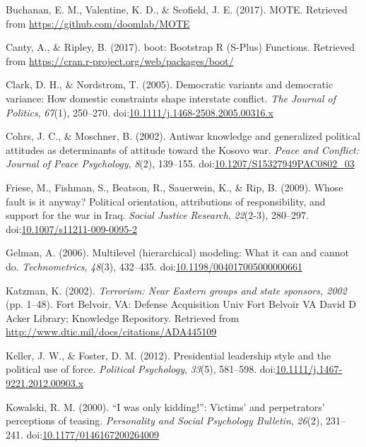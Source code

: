 \documentclass[english,,man]{apa6}
\theoremstyle{definition}
\theoremstyle{definition}
\theoremstyle{definition}
\theoremstyle{remark}
\begin{document}
\leavevmode\hypertarget{ref-Buchanan2017}{}%
Buchanan, E. M., Valentine, K. D., \& Scofield, J. E. (2017). MOTE.
Retrieved from \url{https://github.com/doomlab/MOTE}

\leavevmode\hypertarget{ref-Canty2017}{}%
Canty, A., \& Ripley, B. (2017). boot: Bootstrap R (S-Plus) Functions.
Retrieved from \url{https://cran.r-project.org/web/packages/boot/}

\leavevmode\hypertarget{ref-Clark2005}{}%
Clark, D. H., \& Nordstrom, T. (2005). Democratic variants and
democratic variance: How domestic constraints shape interstate conflict.
\emph{The Journal of Politics}, \emph{67}(1), 250--270.
doi:\href{https://doi.org/10.1111/j.1468-2508.2005.00316.x}{10.1111/j.1468-2508.2005.00316.x}

\leavevmode\hypertarget{ref-Cohrs2002}{}%
Cohrs, J. C., \& Moschner, B. (2002). Antiwar knowledge and generalized
political attitudes as determinants of attitude toward the Kosovo war.
\emph{Peace and Conflict: Journal of Peace Psychology}, \emph{8}(2),
139--155.
doi:\href{https://doi.org/10.1207/S15327949PAC0802_03}{10.1207/S15327949PAC0802\_03}

\leavevmode\hypertarget{ref-Friese2009}{}%
Friese, M., Fishman, S., Beatson, R., Sauerwein, K., \& Rip, B. (2009).
Whose fault is it anyway? Political orientation, attributions of
responsibility, and support for the war in Iraq. \emph{Social Justice
Research}, \emph{22}(2-3), 280--297.
doi:\href{https://doi.org/10.1007/s11211-009-0095-2}{10.1007/s11211-009-0095-2}

\leavevmode\hypertarget{ref-Gelman2006}{}%
Gelman, A. (2006). Multilevel (hierarchical) modeling: What it can and
cannot do. \emph{Technometrics}, \emph{48}(3), 432--435.
doi:\href{https://doi.org/10.1198/004017005000000661}{10.1198/004017005000000661}

\leavevmode\hypertarget{ref-Katzman2002}{}%
Katzman, K. (2002). \emph{Terrorism: Near Eastern groups and state
sponsors, 2002} (pp. 1--48). Fort Belvoir, VA: Defense Acquisition Univ
Fort Belvoir VA David D Acker Library; Knowledge Repository. Retrieved
from \url{http://www.dtic.mil/docs/citations/ADA445109}

\leavevmode\hypertarget{ref-Keller2012}{}%
Keller, J. W., \& Foster, D. M. (2012). Presidential leadership style
and the political use of force. \emph{Political Psychology},
\emph{33}(5), 581--598.
doi:\href{https://doi.org/10.1111/j.1467-9221.2012.00903.x}{10.1111/j.1467-9221.2012.00903.x}

\leavevmode\hypertarget{ref-Kowalski2000}{}%
Kowalski, R. M. (2000). ``I was only kidding!'': Victims' and
perpetrators' perceptions of teasing. \emph{Personality and Social
Psychology Bulletin}, \emph{26}(2), 231--241.
doi:\href{https://doi.org/10.1177/0146167200264009}{10.1177/0146167200264009}
\end{document}
